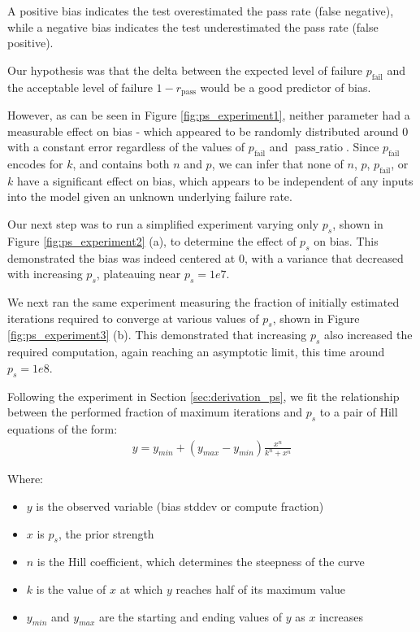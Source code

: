 A positive bias indicates the test overestimated the pass rate (false negative), while a negative bias indicates the test underestimated the pass rate (false positive).

Our hypothesis was that the delta between the expected level of failure $p_{\text{fail}}$ and the acceptable level of failure $1 - r_\text{pass}$ would be a good predictor of bias.

However, as can be seen in Figure \ref{fig:ps_experiment1}, neither parameter had a measurable effect on bias - which appeared to be randomly distributed around 0 with a constant error regardless of the values of $p_{\text{fail}}$ and $\operatorname{pass\_ratio}$. Since $p_{\text{fail}}$ encodes for $k$, and contains both $n$ and $p$, we can infer that none of $n$, $p$, $p_{\text{fail}}$, or $k$ have a significant effect on bias, which appears to be independent of any inputs into the model given an unknown underlying failure rate.


Our next step was to run a simplified experiment varying only $p_s$, shown in Figure \ref{fig:ps_experiment2} (a), to determine the effect of $p_s$ on bias. This demonstrated the bias was indeed centered at $0$, with a variance that decreased with increasing $p_s$, plateauing near $p_s = 1e7$.

We next ran the same experiment measuring the fraction of initially estimated iterations required to converge at various values of $p_s$, shown in Figure \ref{fig:ps_experiment3} (b). This demonstrated that increasing $p_s$ also increased the required computation, again reaching an asymptotic limit, this time around $p_s = 1e8$.


Following the experiment in Section \ref{sec:derivation_ps}, we fit the relationship between the performed fraction of maximum iterations and $p_s$ to a pair of Hill equations \cite{Gesztelyi2012} of the form:
\begin{align}
    y = y_{min} + (y_{max} - y_{min}) \frac{x^n}{k^n + x^n}
\end{align}

Where:
\begin{itemize}
    \item $y$ is the observed variable (bias stddev or compute fraction)
    \item $x$ is $p_s$, the prior strength
    \item $n$ is the Hill coefficient, which determines the steepness of the curve
    \item $k$ is the value of $x$ at which $y$ reaches half of its maximum value
    \item $y_{min}$ and $y_{max}$ are the starting and ending values of $y$ as $x$ increases
\end{itemize}

